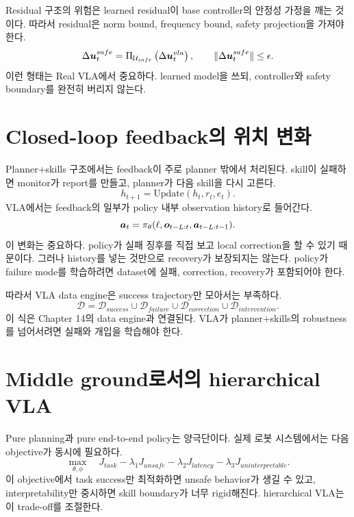 Residual 구조의 위험은 learned residual이 base controller의 안정성 가정을 깨는 것이다. 따라서 residual은 norm bound, frequency bound, safety projection을 가져야 한다.
\begin{equation}
  \Delta \bm{u}_t^{safe}
  =
  \Pi_{\mathcal{U}_{safe}}
  \left(\Delta \bm{u}_t^{vla}\right),
  \qquad
  \|\Delta \bm{u}_t^{safe}\| \leq \epsilon.
  \label{eq:residual-projection}
\end{equation}
이런 형태는 Real VLA에서 중요하다. learned model을 쓰되, controller와 safety boundary를 완전히 버리지 않는다.

\section{Closed-loop feedback의 위치 변화}

Planner+skills 구조에서는 feedback이 주로 planner 밖에서 처리된다. skill이 실패하면 monitor가 report를 만들고, planner가 다음 skill을 다시 고른다.
\begin{equation}
  h_{t+1}
  =
  \mathrm{Update}(h_t,r_t,e_t).
  \label{eq:external-feedback-update}
\end{equation}
VLA에서는 feedback의 일부가 policy 내부 observation history로 들어간다.
\begin{equation}
  \bm{a}_t
  =
  \pi_{\theta}(\ell,\bm{o}_{t-L:t},\bm{a}_{t-L:t-1}).
  \label{eq:vla-feedback-history}
\end{equation}
이 변화는 중요하다. policy가 실패 징후를 직접 보고 local correction을 할 수 있기 때문이다. 그러나 history를 넣는 것만으로 recovery가 보장되지는 않는다. policy가 failure mode를 학습하려면 dataset에 실패, correction, recovery가 포함되어야 한다.

따라서 VLA data engine은 success trajectory만 모아서는 부족하다.
\begin{equation}
  \mathcal{D}
  =
  \mathcal{D}_{success}
  \cup
  \mathcal{D}_{failure}
  \cup
  \mathcal{D}_{correction}
  \cup
  \mathcal{D}_{intervention}.
  \label{eq:vla-data-mixture}
\end{equation}
이 식은 Chapter 14의 data engine과 연결된다. VLA가 planner+skills의 robustness를 넘어서려면 실패와 개입을 학습해야 한다.

\section{Middle ground로서의 hierarchical VLA}

Pure planning과 pure end-to-end policy는 양극단이다. 실제 로봇 시스템에서는 다음 objective가 동시에 필요하다.
\begin{equation}
  \max_{\theta,\phi}
  \quad
  J_{task}
  -
  \lambda_1 J_{unsafe}
  -
  \lambda_2 J_{latency}
  -
  \lambda_3 J_{uninterpretable}.
  \label{eq:vla-system-objective}
\end{equation}
이 objective에서 task success만 최적화하면 unsafe behavior가 생길 수 있고, interpretability만 중시하면 skill boundary가 너무 rigid해진다. hierarchical VLA는 이 trade-off를 조절한다.

